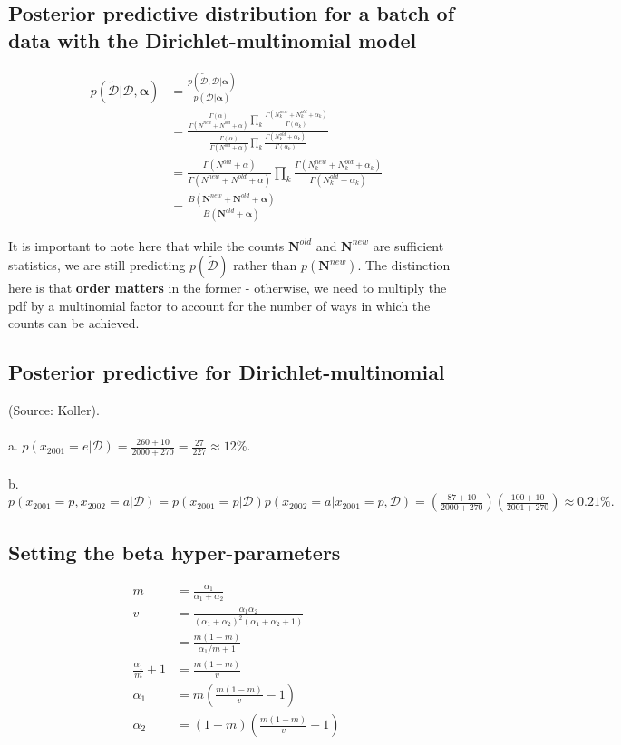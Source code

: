 \documentclass{article}
\begin{document}
\subsection{Posterior predictive distribution for a batch of data with the Dirichlet-multinomial model}
\begin{align*}
p(\tilde{\mathcal{D}}|\mathcal{D},\bm\alpha) &= \frac{p(\tilde{\mathcal{D}},\mathcal{D}|\bm\alpha)}{p(\mathcal{D}|\bm\alpha)}\\
&= \frac{
	\frac{\Gamma(\alpha)}{\Gamma(N^{new}+N^{old}+\alpha)} \prod_{k} \frac{\Gamma(N_k^{new}+N_k^{old}+\alpha_k)}{\Gamma(\alpha_k)}
}{
	\frac{\Gamma(\alpha)}{\Gamma(N^{old}+\alpha)} \prod_{k} \frac{\Gamma(N_k^{old}+\alpha_k)}{\Gamma(\alpha_k)}
}\\
&= \frac{\Gamma(N^{old}+\alpha)}{\Gamma(N^{new}+N^{old}+\alpha)} \prod_{k} \frac{\Gamma(N_k^{new}+N_k^{old}+\alpha_k)}{\Gamma(N_k^{old}+\alpha_k)}\\
&= \frac{B(\mathbf{N}^{new}+\mathbf{N}^{old}+\bm\alpha)}{B(\mathbf{N}^{old}+\bm\alpha)}
\end{align*}

It is important to note here that while the counts $\mathbf{N}^{old}$ and $\mathbf{N}^{new}$ are sufficient statistics, we are still predicting $p(\tilde{\mathcal{D}})$ rather than $p(\mathbf{N}^{new})$. The distinction here is that \textbf{order matters} in the former - otherwise, we need to multiply the pdf by a multinomial factor to account for the number of ways in which the counts can be achieved.

\subsection{Posterior predictive for Dirichlet-multinomial}
(Source: Koller).\\\\
a. $p(x_{2001}=e|\mathcal{D}) = \frac{260+10}{2000+270} = \frac{27}{227} \approx 12\%.$\\\\
b. $p(x_{2001}=p,x_{2002}=a|\mathcal{D}) = p(x_{2001}=p|\mathcal{D})p(x_{2002}=a|x_{2001}=p,\mathcal{D}) = \left(\frac{87+10}{2000+270}\right) \left(\frac{100+10}{2001+270}\right) \approx 0.21\%.$

\subsection{Setting the beta hyper-parameters}
\begin{align*}
m &= \frac{\alpha_1}{\alpha_1+\alpha_2}\\
v &= \frac{\alpha_1\alpha_2}{(\alpha_1+\alpha_2)^2(\alpha_1+\alpha_2+1)}\\
&= \frac{m(1-m)}{\alpha_1/m+1}\\
\frac{\alpha_1}{m}+1 &= \frac{m(1-m)}{v}\\
\alpha_1 &= m\left(\frac{m(1-m)}{v}-1\right)\\
\alpha_2 &= (1-m)\left(\frac{m(1-m)}{v}-1\right)
\end{align*}
\end{document}
